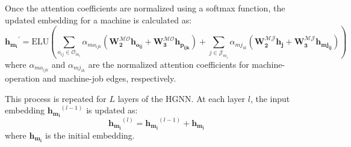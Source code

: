 Once the attention coefficients are normalized using a softmax function, the updated embedding for a machine is calculated as:
\begin{equation}
\boldsymbol{h_{m_i}}^\prime = \text{ELU} \left( \sum_{o_{ij} \in \mathcal{O}_{m_i}} \alpha_{mo_{ijk}} \left( \boldsymbol{W_2^\mathcal{MO}} \boldsymbol{h_{o_{ij}}} + \boldsymbol{W_3^\mathcal{MO}} \boldsymbol{h_{p_{ijk}}} \right) + \sum_{j \in \mathcal{J}_{m_i}} \alpha_{mj_{ik}} \left( \boldsymbol{W_2^\mathcal{MJ}} \boldsymbol{h_{j}} + \boldsymbol{W_3^\mathcal{MJ}} \boldsymbol{h_{mj_{ij}}} \right) \right)
\end{equation}
where $\alpha_{mo_{ijk}}$ and $\alpha_{mj_{ik}}$ are the normalized attention coefficients for machine-operation and machine-job edges, respectively.

This process is repeated for $L$ layers of the HGNN. At each layer $l$, the input embedding $\boldsymbol{h_{m_i}}^{(l-1)}$ is updated as:
\begin{equation}
\boldsymbol{h_{m_i}}^{(l)} = \boldsymbol{h_{m_i}}^{(l-1)} + \boldsymbol{h_{m_i}}
\end{equation}
where $\boldsymbol{h_{m_i}}$ is the initial embedding.






